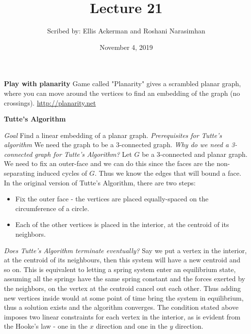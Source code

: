 \documentclass{article}
\begin{document}
  \title{Lecture 21}
  \author{Scribed by: Ellis Ackerman and Roshani Narasimhan}
  \date{November 4, 2019}
  \maketitle
  \noindent \textbf{Play with planarity}
  Game called "Planarity" gives a scrambled planar graph, where you can move around the vertices to find an embedding of the graph (no crossings). \href{http://planarity.net}{http://planarity.net}
  
  \noindent \textbf{Tutte's Algorithm}
  
  \textit{Goal} Find a linear embedding of a planar graph.
  \noindent \textit{Prerequisites for Tutte's algorithm} We need the graph to be a 3-connected graph.
  \newline \noindent \textit{Why do we need a 3-connected graph for Tutte's Algorithm?} Let $G$ be a 3-connected and planar graph. We need to fix an outer-face and we can do this since the faces are the non-separating induced cycles of $G$. Thus we know the edges that will bound a face.
  In the original version of Tutte's Algorithm, there are two steps:
  \begin{itemize}
      \item Fix the outer face - the vertices are placed equally-spaced on the circumference of a circle.
      \item Each of the other vertices is placed in the interior, at the centroid of its neighbors. 
  \end{itemize} 
  \noindent \textit{Does Tutte's Algorithm terminate eventually?}
  Say we put a vertex in the interior, at the centroid of its neighbours, then this system will have a new centroid and so on.
  This is equivalent to letting a spring system enter an equilibrium state, assuming all the springs have the same spring constant and the forces exerted by the neighbors, on the vertex at the centroid cancel out each other. Thus adding new vertices inside would at some point of time bring the system in equilibrium, thus a solution exists and the algorithm converges.  
  The condition stated above imposes two linear constraints for each vertex in the interior, as is evident from the Hooke's law - one in the $x$ direction and one in the $y$ direction.
  
\end{document}
